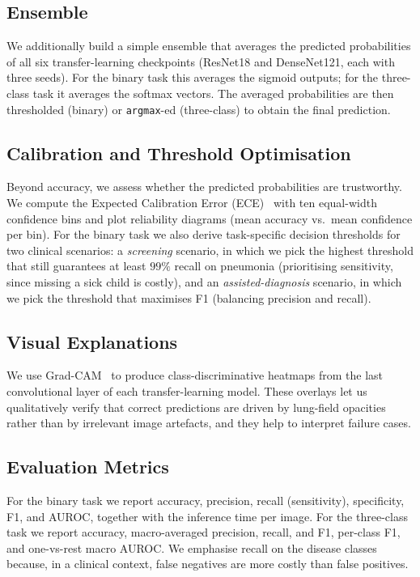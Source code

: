 \documentclass[runningheads]{llncs}
\begin{document}
\subsection{Ensemble}

We additionally build a simple ensemble that averages the predicted
probabilities of all six transfer-learning checkpoints (ResNet18 and
DenseNet121, each with three seeds). For the binary task this averages the
sigmoid outputs; for the three-class task it averages the softmax vectors.
The averaged probabilities are then thresholded (binary) or
\texttt{argmax}-ed (three-class) to obtain the final prediction.

\subsection{Calibration and Threshold Optimisation}

Beyond accuracy, we assess whether the predicted probabilities are
trustworthy. We compute the Expected Calibration Error
(ECE)~\cite{ref_calibration} with ten equal-width confidence bins and plot
reliability diagrams (mean accuracy vs.\ mean confidence per bin). For the
binary task we also derive task-specific decision thresholds for two
clinical scenarios: a \emph{screening} scenario, in which we pick the
highest threshold that still guarantees at least $99\%$ recall on pneumonia
(prioritising sensitivity, since missing a sick child is costly), and an
\emph{assisted-diagnosis} scenario, in which we pick the threshold that
maximises F1 (balancing precision and recall).

\subsection{Visual Explanations}

We use Grad-CAM~\cite{ref_gradcam} to produce class-discriminative
heatmaps from the last convolutional layer of each transfer-learning
model. These overlays let us qualitatively verify that correct predictions
are driven by lung-field opacities rather than by irrelevant image
artefacts, and they help to interpret failure cases.

\subsection{Evaluation Metrics}

For the binary task we report accuracy, precision, recall (sensitivity),
specificity, F1, and AUROC, together with the inference time per image.
For the three-class task we report accuracy, macro-averaged precision,
recall, and F1, per-class F1, and one-vs-rest macro AUROC. We emphasise
recall on the disease classes because, in a clinical context, false
negatives are more costly than false positives.
\end{document}
